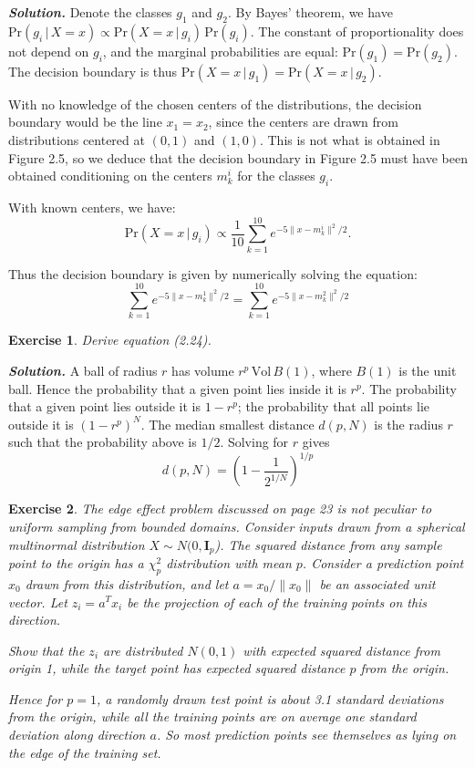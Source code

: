 \documentclass[12pt]{article}
\def\bI{\textbf{I}}
\def\Pr{\text{Pr}}
\newtheorem{exercise}{Exercise}[section]
\newenvironment{solution}[1][\it{Solution}]{\textbf{#1. } }{\vspace{.5cm}}
\begin{document}
\begin{solution}
Denote the classes $g_1$ and $g_2$. By Bayes' theorem, we have $	\Pr(g_i \, \vert\, X = x) \propto \Pr(X = x \, \vert\, g_i)\, \Pr(g_i)$. The constant of proportionality does not depend on $g_i$, and the marginal probabilities are equal: $\Pr(g_1) = \Pr(g_2)$. The decision boundary is thus $\Pr(X = x \, \vert\, g_1) = \Pr(X = x \, \vert\, g_2)$.

With no knowledge of the chosen centers of the distributions, the decision boundary would be the line $x_1 = x_2$, since the centers are drawn from distributions centered at $(0,1)$ and $(1,0)$. This is not what is obtained in Figure 2.5, so we deduce that the decision boundary in Figure 2.5 must have been obtained conditioning on the centers $m_k^i$ for the classes $g_i$. 

With known centers, we have:
$$\Pr(X = x \, \vert\, g_i) \propto \frac{1}{10} \sum_{k=1}^{10} e^{-5\|x-m_k^i\|^2/2}.$$

Thus the decision boundary is given by numerically solving the equation:
$$\sum_{k=1}^{10} e^{-5\|x-m_k^1\|^2/2} = \sum_{k=1}^{10} e^{-5\|x-m_k^2\|^2/2}$$
\end{solution}


\begin{exercise}
    Derive equation (2.24).
\end{exercise}

\begin{solution}
    A ball of radius $r$ has volume $r^p \, \text{Vol} \,B(1)$, where $B(1)$ is the unit ball. Hence the probability that a given point lies inside it is $r^p$. The probability that a given point lies outside it is $1-r^p$; the probability that all points lie outside it is $(1-r^p)^N$. The median smallest distance $d(p,N)$ is the radius $r$ such that the probability above is $1/2$. Solving for $r$ gives
    $$d(p,N) = \left(1-\frac{1}{2^{1/N}}\right)^{1/p}$$
\end{solution}


\begin{exercise}
The edge effect problem discussed on page 23 is not peculiar to uniform sampling from bounded domains. Consider inputs drawn from a spherical multinormal distribution $X \sim N(0, \bI_p$). The squared distance from any sample point to the origin has a $\chi_p^2$ distribution with mean $p$. Consider a prediction point $x_0$ drawn from this distribution, and let $a = x_0 / \|x_0\|$ be an associated unit vector. Let $z_i = a^T x_i$ be the projection of each of the training points on this direction.

Show that the $z_i$ are distributed $N(0,1)$ with expected squared distance from origin 1, while the target point has expected squared distance $p$ from the origin. 

Hence for $p = 1$, a randomly drawn test point is about 3.1 standard deviations from the origin, while all the training points are on average one standard deviation along direction $a$. So most prediction points see themselves as lying on the edge of the training set.	
\end{exercise}
\end{document}
